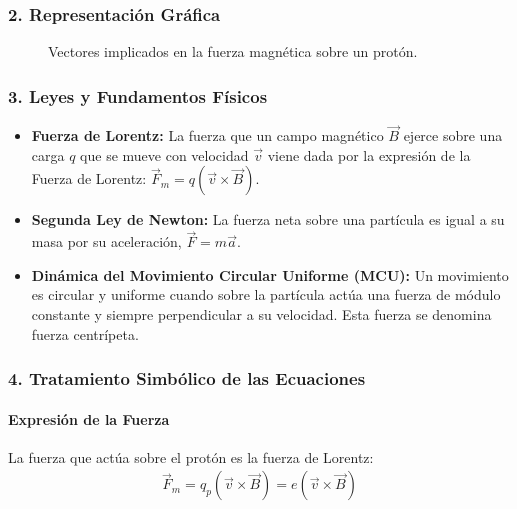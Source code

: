 \subsubsection*{2. Representación Gráfica}
\begin{figure}[H]
    \centering
    \caption{Vectores implicados en la fuerza magnética sobre un protón.}
\end{figure}

\subsubsection*{3. Leyes y Fundamentos Físicos}
\begin{itemize}
    \item \textbf{Fuerza de Lorentz:} La fuerza que un campo magnético $\vec{B}$ ejerce sobre una carga $q$ que se mueve con velocidad $\vec{v}$ viene dada por la expresión de la Fuerza de Lorentz: $\vec{F}_m = q (\vec{v} \times \vec{B})$.
    \item \textbf{Segunda Ley de Newton:} La fuerza neta sobre una partícula es igual a su masa por su aceleración, $\vec{F} = m\vec{a}$.
    \item \textbf{Dinámica del Movimiento Circular Uniforme (MCU):} Un movimiento es circular y uniforme cuando sobre la partícula actúa una fuerza de módulo constante y siempre perpendicular a su velocidad. Esta fuerza se denomina fuerza centrípeta.
\end{itemize}

\subsubsection*{4. Tratamiento Simbólico de las Ecuaciones}
\paragraph*{Expresión de la Fuerza}
La fuerza que actúa sobre el protón es la fuerza de Lorentz:
\begin{gather}
    \vec{F}_m = q_p (\vec{v} \times \vec{B}) = e (\vec{v} \times \vec{B})
\end{gather}


